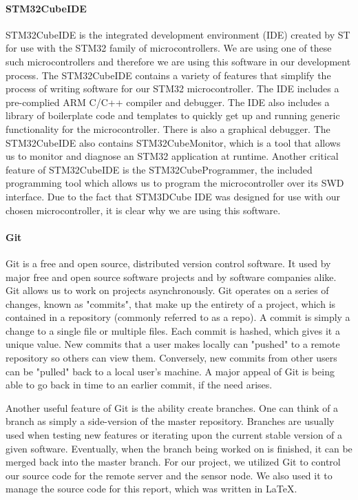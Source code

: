 \paragraph{STM32CubeIDE}
STM32CubeIDE is the integrated development environment (IDE) created by ST for use with the STM32 family of microcontrollers. We are using one of these such microcontrollers and therefore we are using this software in our development process. The STM32CubeIDE contains a variety of features that simplify the process of writing software for our STM32 microcontroller. The IDE includes a pre-complied ARM C/C++ compiler and debugger. The IDE also includes a library of boilerplate code and templates to quickly get up and running generic functionality for the microcontroller. There is also a graphical debugger. The STM32CubeIDE also contains STM32CubeMonitor, which is a tool that allows us to monitor and diagnose an STM32 application at runtime. Another critical feature of STM32CubeIDE is the STM32CubeProgrammer, the included programming tool which allows us to program the microcontroller over its SWD interface. Due to the fact that STM3DCube IDE was designed for use with our chosen microcontroller, it is clear why we are using this software.

\paragraph{Git}
Git is a free and open source, distributed version control software. It used by major free and open source software projects and by software companies alike. Git allows us to work on projects asynchronously. Git operates on a series of changes, known as "commits", that make up the entirety of a project, which is contained in a repository (commonly referred to as a repo). A commit is simply a change to a single file or multiple files. Each commit is hashed, which gives it a unique value. New commits that a user makes locally can "pushed" to a remote repository so others can view them. Conversely, new commits from other users can be "pulled" back to a local user's machine. A major appeal of Git is being able to go back in time to an earlier commit, if the need arises. 

Another useful feature of Git is the ability create branches. One can think of a branch as simply a side-version of the master repository. Branches are usually used when testing new features or iterating upon the current stable version of a given software. Eventually, when the branch being worked on is finished, it can be merged back into the master branch. For our project, we utilized Git to control our source code for the remote server and the sensor node. We also used it to manage the source code for this report, which was written in LaTeX.

